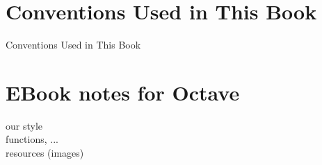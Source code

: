 \section{Conventions Used in This Book}
Conventions Used in This Book
\section{EBook notes for Octave}
    our style\\
    functions, ...\\
    resources (images)\\

